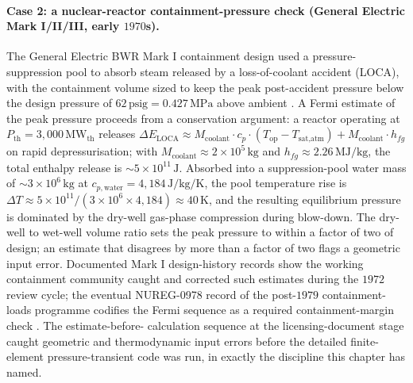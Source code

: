 \paragraph{Case 2: a nuclear-reactor containment-pressure check
(General Electric Mark I/II/III, early $1970$s).} The General
Electric BWR Mark I containment design used a pressure-suppression
pool to absorb steam released by a loss-of-coolant accident
(LOCA), with the containment volume sized to keep the peak
post-accident pressure below the design pressure of $62 \,
\text{psig} = 0.427 \,\si{\mega\pascal}$ above ambient
\cite{paper:ch09t3b-nureg-cr-7222-2016}. A Fermi estimate of the
peak pressure proceeds from a conservation argument: a reactor
operating at $P_{\text{th}} = 3{,}000 \,\si{\mega\watt}_{\text{th}}$
releases $\Delta E_{\text{LOCA}} \approx M_{\text{coolant}} \cdot
c_{p} \cdot (T_{\text{op}} - T_{\text{sat,atm}})
+ M_{\text{coolant}} \cdot h_{fg}$ on rapid depressurisation;
with $M_{\text{coolant}} \approx 2 \times 10^{5} \,
\si{\kilogram}$ and $h_{fg} \approx 2.26 \,
\si{\mega\joule\per\kilogram}$, the total enthalpy release is
$\sim 5 \times 10^{11} \,\si{\joule}$. Absorbed into a
suppression-pool water mass of $\sim 3 \times 10^{6} \,
\si{\kilogram}$ at $c_{p,\text{water}} = 4{,}184 \,
\si{\joule\per\kilogram\per\kelvin}$, the pool temperature rise is
$\Delta T \approx 5 \times 10^{11} / (3 \times 10^{6} \times
4{,}184) \approx 40 \,\si{\kelvin}$, and the resulting equilibrium
pressure is dominated by the dry-well gas-phase compression
during blow-down. The dry-well to wet-well volume ratio sets the
peak pressure to within a factor of two of design; an estimate
that disagrees by more than a factor of two flags a geometric
input error. Documented Mark I design-history records show the
working containment community caught and corrected such estimates
during the $1972$ review cycle; the eventual NUREG-0978 record of
the post-$1979$ containment-loads programme codifies the Fermi
sequence as a required containment-margin check
\cite{paper:ch09t3b-nureg-cr-7222-2016}. The estimate-before-
calculation sequence at the licensing-document stage caught
geometric and thermodynamic input errors before the detailed
finite-element pressure-transient code was run, in exactly the
discipline this chapter has named.

